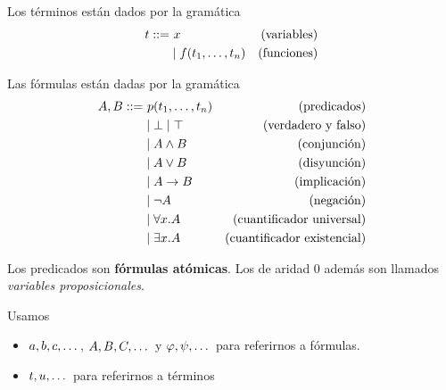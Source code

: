 \begin{definition}[Términos]
    Los términos están dados por la gramática
    \begin{align*}
        \term ::= &\ \var                               &\text{(variables)} \\
                  & \mid \fun(\term_1, \dots, \term_n) &\text{(funciones)}
    \end{align*}
\end{definition}

\begin{definition}[Fórmulas]
    Las fórmulas están dadas por la gramática
    \begin{align*}
        A, B ::=
         & \ p(t_1, \dots, t_n) & (\text{predicados})                \\
         & \mid \bot \mid \top             & \text{(verdadero y falso)}         \\
         & \mid A \wedge B        & \text{(conjunción)}                \\
         & \mid A \vee B         & \text{(disyunción)}                \\
         & \mid A \to B        & \text{(implicación)}               \\
         & \mid \neg A                 & \text{(negación)}                  \\
         & \mid \forall x . A        & \text{(cuantificador universal)}   \\
         & \mid \exists x . A        & \text{(cuantificador existencial)}
    \end{align*}

    Los predicados son \textbf{fórmulas atómicas}. Los de aridad 0 además son llamados \textit{variables proposicionales}.
\end{definition}

\begin{notation*}
    Usamos
    \begin{itemize}
        \item $a, b, c, \dots$, $A, B, C, \dots$ y $\varphi, \psi, \dots$ para referirnos a fórmulas.
        \item $t, u, \dots$ para referirnos a términos
    \end{itemize}
\end{notation*}

